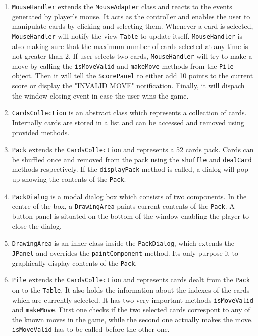 \documentclass[a4paper, 12pt, titlepage]{article}
\begin{document}
\begin{enumerate}
	\item \texttt{MouseHandler} extends the \texttt{MouseAdapter} class and reacts to
		the events generated by player's mouse. It acts as the controller and enables the 
		user to manipulate cards by clicking and selecting them. Whenever a card is 
		selected, \texttt{MouseHandler} will notify the view \texttt{Table} to update 
		itself. \texttt{MouseHandler} is also making sure that the maximum number of 
		cards selected at any time is not greater than 2. If user selects two cards, 
		\texttt{MouseHandler} will try to make a move by calling the \texttt{isMoveValid}
		 and \texttt{makeMove} methods from the \texttt{Pile} object. Then it will 
		 tell the \texttt{ScorePanel} to either add 10 points to the current score or
		 display the "INVALID MOVE" notification. Finally, it will dispach the window 
		 closing event in case the user wins the game.
		 
	\item \texttt{CardsCollection} is an abstract class which represents a collection of 
		cards. Internally cards are stored in a list and can be accessed and removed 
		using provided methods.
		
	\item \texttt{Pack} extends the \texttt{CardsCollection} and represents a 52 cards 
		pack. Cards can be shuffled once and removed from the pack using the 
		\texttt{shuffle} and \texttt{dealCard} methods respectively. If the 
		\texttt{displayPack} method is called, a dialog will pop up showing the contents 
		of the \texttt{Pack}.
	
	\item \texttt{PackDialog} is a modal dialog box which consists of two components. 
		In the centre of the box, a \texttt{DrawingArea} paints current contents of the
		\texttt{Pack}. A button panel is situated on the bottom of the window enabling
		the player to close the dialog.  
	
	\item \texttt{DrawingArea} is an inner class inside the \texttt{PackDialog}, which 
		extends the \texttt{JPanel} and overrides the \texttt{paintComponent} method. Its
		only purpose it to graphically display contents of the \texttt{Pack}.		
	
	\item \texttt{Pile} extends the \texttt{CardsCollection} and represents cards 
		dealt from the \texttt{Pack} on to the \texttt{Table}. It also holds the 
		information about the indexes of the cards which are currently selected. It has 
		two very important methods \texttt{isMoveValid} and \texttt{makeMove}. First one 
		checks if the two selected cards correspont to any of the known moves in the 
		game, while the second one actually makes the move. \texttt{isMoveValid} has to 
		be called before the other one. 


\end{enumerate}
\end{document}
